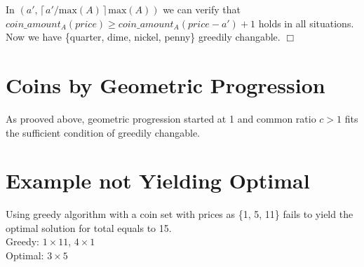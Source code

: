 \documentclass[UTF8]{article}
\begin{document}
    In $(a', \left\lceil a'/\mathrm{max}(A)\right\rceil \mathrm{max}(A))$ we can verify that $coin\_amount_{A}(price) \geq coin\_amount_{A}(price-a')+1$ holds in all situations. Now we have \{quarter, dime, nickel, penny\} greedily changable. $\Box$ 

    \section{Coins by Geometric Progression}
    As prooved above, geometric progression started at 1 and common ratio $c > 1$ fits the sufficient condition of greedily changable.

    \section{Example not Yielding Optimal}
    Using greedy algorithm with a coin set with prices as \{1, 5, 11\} fails to yield the optimal solution for total equals to 15.\\
    Greedy: $1\times 11$, $4 \times 1$\\
    Optimal: $3 \times 5$
\end{document}
